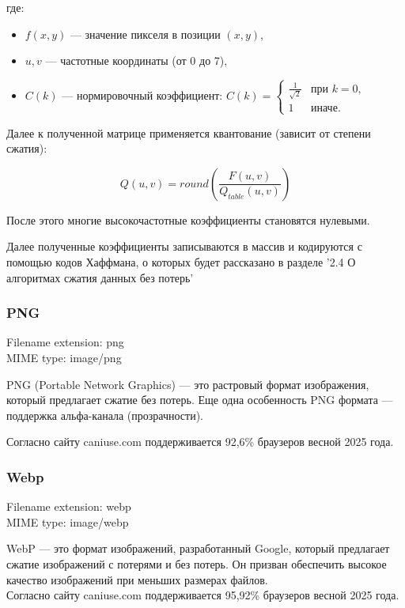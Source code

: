 \documentclass[12pt]{article}
\begin{document}
где:
\begin{itemize}
    \item $f(x,y)$ — значение пикселя в позиции $(x,y)$,
    \item $u,v$ — частотные координаты (от 0 до 7),
    \item $C(k)$ — нормировочный коэффициент:
          $
              C(k) = \begin{cases}
                  \frac{1}{\sqrt{2}} & \text{при } k=0, \\
                  1                  & \text{иначе}.
              \end{cases}
          $
\end{itemize}

Далее к полученной матрице применяется квантование (зависит от степени сжатия):

\[
    Q(u, v) = round(\frac{F(u, v)}{Q_{table}(u, v)})
\]

После этого многие высокочастотные коэффициенты становятся нулевыми.

Далее полученные коэффициенты записываются в массив и кодируются с помощью кодов Хаффмана, о которых
будет рассказано в разделе '2.4 О алгоритмах сжатия данных без потерь'

\subsubsection{PNG}

Filename extension: png\\
MIME type: image/png

PNG (Portable Network Graphics) — это растровый формат изображения, который предлагает сжатие
без потерь. Еще одна особенность PNG формата — поддержка альфа-канала (прозрачности).

Согласно сайту caniuse.com поддерживается 92,6\% браузеров весной 2025 года.

\subsubsection{Webp}
Filename extension: webp\\
MIME type: image/webp

WebP — это формат изображений, разработанный Google, который предлагает сжатие изображений
с потерями и без потерь. Он призван обеспечить высокое качество изображений при меньших размерах файлов.\\

Согласно сайту caniuse.com поддерживается 95,92\% браузеров весной 2025 года.
\end{document}
